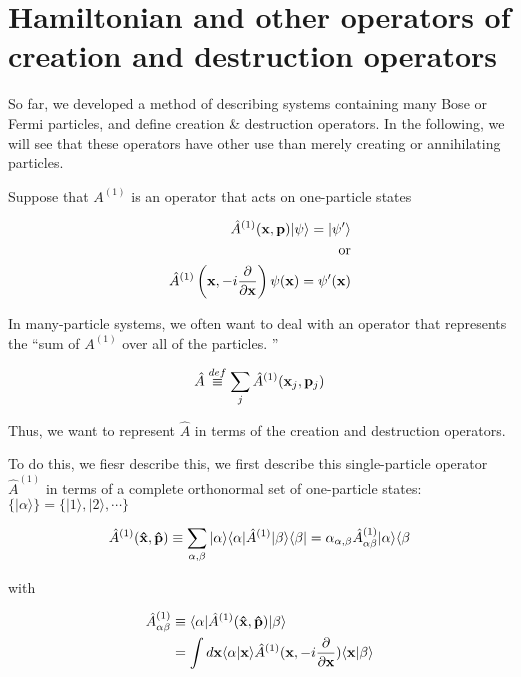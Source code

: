 \section{Hamiltonian and other operators of creation and destruction operators}

So far, we developed a method of describing systems containing many Bose or Fermi particles, and define creation \& destruction operators. In the following, we will see that these operators have other use than merely creating or annihilating particles. 

Suppose that $A^{(1)}$ is an operator that acts on one-particle states

\begin{align}
\begin{split}
\hat{A}^{(1)}({\bf x},{\bf p})|\psi\rangle = |\psi'\rangle \\
\text{or}\\
\hat{A}^{(1)}\left({\bf x},-i\frac{\partial}{\partial {\bf x}}\right)\psi({\bf x}) = \psi'({\bf x})
\end{split}
\end{align}

In many-particle systems, we often want to deal with an operator that represents the ``sum of $A^{(1)}$ over all of the particles. ''

\begin{align}
\hat{A}\overset{def}{\equiv}\sum_j\hat{A}^{(1)}({\bf x}_j,{\bf p}_j)
\end{align}

Thus, we want to represent $\hat{A}$ in terms of the creation and destruction operators. 

To do this, we fiesr describe this, we first describe this single-particle operator $\hat{A}^{(1)}$ in terms of a complete orthonormal set of one-particle states: $\{|\alpha\rangle\} = \{|1\rangle,|2\rangle,\cdots\}$

\begin{align}
\hat{A}^{(1)}({\bf \hat{x}, \hat{p}}) \equiv \sum_{\alpha,\beta}|\alpha\rangle\langle\alpha| \hat{A}^{(1)}|\beta\rangle\langle\beta| = \alpha_{\alpha,\beta}\hat{A}^{(1)}_{\alpha\beta}|\alpha\rangle\langle\beta
\end{align}

with

\begin{align}
\begin{split}
\hat{A}^{(1)}_{\alpha\beta} &\equiv\langle\alpha|\hat{A}^{(1)}({\bf \hat{x},\hat{p}})|\beta\rangle \\
&=\int d{\bf x} \langle\alpha|{\bf x}\rangle\hat{A}^{(1)}({\bf x}, -i\frac{\partial}{\partial{\bf x}})\langle{\bf x}|\beta\rangle
\end{split}
\end{align}

